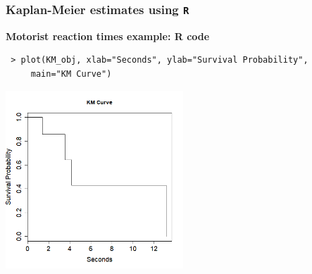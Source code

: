 \begin{frame}[fragile]
\frametitle{Kaplan-Meier estimates using \texttt{R}}
\textbf{Motorist reaction times example: R code}
\begin{verbatim}
 > plot(KM_obj, xlab="Seconds", ylab="Survival Probability",
     main="KM Curve")
\end{verbatim}
\includegraphics[width=0.50\textwidth]{Figures/KM_curve_samp_motorist.png}
\end{frame}


 